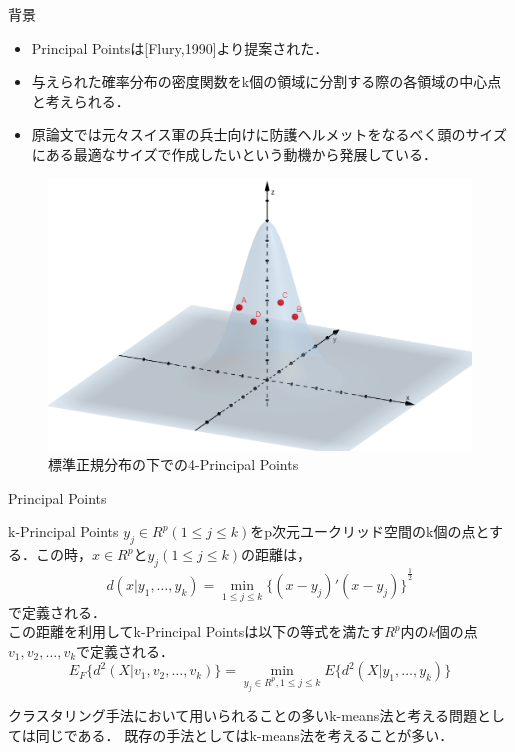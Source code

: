 \documentclass[unicode,11pt]{beamer}
\begin{document}
\begin{frame}{背景}
    \begin{itemize}
        \item Principal Pointsは[Flury,1990]より提案された．
        \item 与えられた確率分布の密度関数をk個の領域に分割する際の各領域の中心点と考えられる．
        \item 原論文では元々スイス軍の兵士向けに防護ヘルメットをなるべく頭のサイズにある最適なサイズで作成したいという動機から発展している．
    \end{itemize}
    \begin{figure}
        \centering
        \includegraphics[keepaspectratio,scale = 0.2]{4-principal_points.png}
        \caption{標準正規分布の下での4-Principal Points}
    \end{figure}
\end{frame}

\begin{frame}{Principal Points}
    \begin{block}{k-Principal Points}
        $y_j \in R^p (1\le j \le k)$をp次元ユークリッド空間のk個の点とする．この時，$x \in  R^p$と$y_j (1 \le j \le k)$の距離は，
        \begin{equation}
            d(x|y_1,\dots,y_k) = \min_{1\le j \le k}{\{(x-y_j)'(x-y_j)\}}^{\frac{1}{2}}
        \end{equation}
        で定義される．\\
        この距離を利用してk-Principal Pointsは以下の等式を満たす$R^p$内の$k$個の点$v_1,v_2,\dots,v_k$で定義される．
        \begin{equation}
            E_F\{d^2(X|v_1,v_2,\dots,v_k)\} = \min_{y_j \in R^p, 1\le j \le k} E\{d^2(X|y_1,\dots, y_k)\}
        \end{equation}
    \end{block}
    クラスタリング手法において用いられることの多いk-means法と考える問題としては同じである．
    既存の手法としてはk-means法を考えることが多い．
\end{frame}
\end{document}
